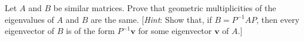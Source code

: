 \documentclass[12pt,letterpaper]{hmcpset}
\begin{document}
\begin{solution}
\vfill
\end{solution}
\newpage

\begin{problem}[4.4.48]
	Let $A$ and $B$ be similar matrices. Prove that geometric multiplicities of the eigenvalues of $A$ and $B$ are the same. [\emph{Hint}: Show that, if $B = P^{-1}AP$, then every eigenvector of $B$ is of the form $P^{-1}\mathbf{v}$ for some eigenvector $\mathbf{v}$ of $A$.]

\end{problem}

\begin{solution}
\vfill
\end{solution}
\end{document}
